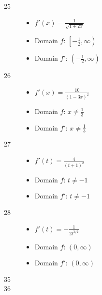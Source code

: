 \documentclass[letterpaper, landscape]{exam}
\begin{document}
\begin{description}
      \item[25]
        \begin{itemize}
          \item $f'(x) = \frac{1}{\sqrt{1 + 2x}}$
          \item Domain $f$: $\left[ - \frac{1}{2}, \infty \right)$
          \item Domain $f'$: $\left( - \frac{1}{2}, \infty \right)$
        \end{itemize}

      \item[26]
        \begin{itemize}
          \item $f'(x) = \frac{10}{(1 - 3x)^2}$
          \item Domain $f$: $x \neq \frac{1}{3}$
          \item Domain $f'$: $x \neq \frac{1}{3}$
        \end{itemize}

      \item[27]
        \begin{itemize}
          \item $f'(t) = \frac{4}{(t + 1)^2}$
          \item Domain $f$: $t \neq -1$
          \item Domain $f'$: $t \neq -1$
        \end{itemize}

      \item[28]
        \begin{itemize}
          \item $f'(t) = -\frac{ 1 }{ 2t^{3/2} }$
          \item Domain $f$: $(0, \infty)$
          \item Domain $f'$: $(0, \infty)$
        \end{itemize}

      \item[35] 

      \item[36] 


\end{description}
\end{document}
